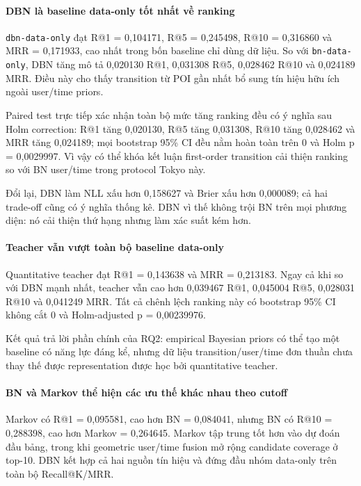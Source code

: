 \paragraph{DBN là baseline data-only tốt nhất về ranking}

\texttt{dbn-data-only} đạt R@1 = 0,104171, R@5 = 0,245498, R@10 = 0,316860 và MRR = 0,171933, cao nhất trong bốn baseline chỉ dùng dữ liệu. So với \texttt{bn-data-only}, DBN tăng mô tả 0,020130 R@1, 0,031308 R@5, 0,028462 R@10 và 0,024189 MRR. Điều này cho thấy transition từ POI gần nhất bổ sung tín hiệu hữu ích ngoài user/time priors.

Paired test trực tiếp xác nhận toàn bộ mức tăng ranking đều có ý nghĩa sau Holm correction: R@1 tăng 0,020130, R@5 tăng 0,031308, R@10 tăng 0,028462 và MRR tăng 0,024189; mọi bootstrap 95\% CI đều nằm hoàn toàn trên 0 và Holm p = 0,0029997. Vì vậy có thể khóa kết luận first-order transition cải thiện ranking so với BN user/time trong protocol Tokyo này.

Đổi lại, DBN làm NLL xấu hơn 0,158627 và Brier xấu hơn 0,000089; cả hai trade-off cũng có ý nghĩa thống kê. DBN vì thế không trội BN trên mọi phương diện: nó cải thiện thứ hạng nhưng làm xác suất kém hơn.

\paragraph{Teacher vẫn vượt toàn bộ baseline data-only}

Quantitative teacher đạt R@1 = 0,143638 và MRR = 0,213183. Ngay cả khi so với DBN mạnh nhất, teacher vẫn cao hơn 0,039467 R@1, 0,045004 R@5, 0,028031 R@10 và 0,041249 MRR. Tất cả chênh lệch ranking này có bootstrap 95\% CI không cắt 0 và Holm-adjusted p = 0,00239976.

Kết quả trả lời phần chính của RQ2: empirical Bayesian priors có thể tạo một baseline có năng lực đáng kể, nhưng dữ liệu transition/user/time đơn thuần chưa thay thế được representation được học bởi quantitative teacher.

\paragraph{BN và Markov thể hiện các ưu thế khác nhau theo cutoff}

Markov có R@1 = 0,095581, cao hơn BN = 0,084041, nhưng BN có R@10 = 0,288398, cao hơn Markov = 0,264645. Markov tập trung tốt hơn vào dự đoán đầu bảng, trong khi geometric user/time fusion mở rộng candidate coverage ở top-10. DBN kết hợp cả hai nguồn tín hiệu và đứng đầu nhóm data-only trên toàn bộ Recall@K/MRR.

